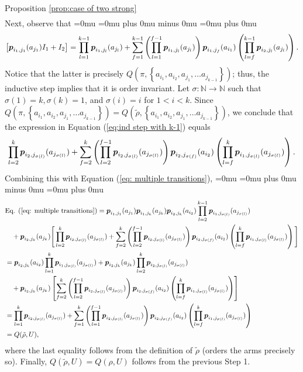 \begin{proofof}{Proposition \ref{prop:case of two strong}}
{\begin{align}
\end{align}}%
Next, observe that
{\thinmuskip=0mu
\medmuskip=0mu plus 0mu minus 0mu
\thickmuskip=0mu plus 0mu
\begin{equation}\label{eq:ind step with k-1}
\left[\boldsymbol{ p }_{{i_1},{j_1}}(a_{j_1})I_1+I_2\right]=\prod_{l=1}^{k-1} \boldsymbol{ p }_{{i_1},{j_l}}(a_{j_l})+\sum_{f=1}^{k-1} \left(\prod_{l=1}^{f-1} \boldsymbol{ p }_{{i_1},{j_l}}(a_{j_l})\right) \boldsymbol{ p }_{{i_1},{j_f}}(a_{i_1}) \left(\prod_{l=f}^{k-1} \boldsymbol{ p }_{{i_2},{j_l}}(a_{j_l})\right).
\end{equation}}%
Notice that the latter is precisely $Q(\pi,\left\{a_{i_1},a_{i_2},a_{j_1},\dots a_{j_{k-1}}\right\})$; thus, the inductive step implies that it is order invariant. Let $\sigma:\mathbb N \rightarrow \mathbb N$ such that $\sigma(1)=k,\sigma(k)=1$, and $\sigma(i)=i$ for $1<i<k$. Since $Q(\pi,\left\{a_{i_1},a_{i_2},a_{j_1},\dots a_{j_{k-1}}\right\})=Q(\tilde \rho,\left\{a_{i_1},a_{i_2},a_{j_1},\dots a_{j_{k-1}}\right\})$, we conclude that the expression in Equation (\ref{eq:ind step with k-1}) equals 
\[
\prod_{l=2}^{k} \boldsymbol{ p }_{{i_2},{j_{\sigma(l)}}}(a_{j_{\sigma(l)}})+\sum_{f=2}^{k} \left(\prod_{l=2}^{f-1} \boldsymbol{ p }_{{i_2},{j_{\sigma(l)}}}(a_{j_{\sigma(l)}})\right) \boldsymbol{ p }_{{i_2},{j_{\sigma(f)}}}(a_{i_2}) \left(\prod_{l=f}^{k} \boldsymbol{ p }_{{i_1},{j_{\sigma(l)}}}(a_{j_{\sigma(l)}})\right).
\]
Combining this with Equation (\ref{eq: multiple transitions}),
{\thinmuskip=0mu
\medmuskip=0mu plus 0mu minus 0mu
\thickmuskip=0mu plus 0mu
\begin{align}
&\textnormal{Eq. }\refeq{eq: multiple transitions}=\bl p_{{i_1},{j_1}}(a_{j_1})\bl p_{{i_1},{j_k}}(a_{j_k})\bl p_{{i_2},{j_k}}(a_{i_2})\prod_{l=2}^{k-1} \bl p_{{i_1},{j_{\sigma(l)}}}(a_{j_{\sigma(l)}})\nonumber\\
&\quad +\bl p_{{i_2},{j_k}}(a_{j_k})\Bigg[
\prod_{l=2}^{k} \bl p_{{i_2},{j_{\sigma(l)}}}(a_{j_{\sigma(l)}})+\sum_{f=2}^{k} \left(\prod_{l=2}^{f-1} \bl p_{{i_2},{j_{\sigma(l)}}}(a_{j_{\sigma(l)}})\right) \bl p_{{i_2},{j_{\sigma(f)}}}(a_{i_2}) \left(\prod_{l=f}^{k} \bl p_{{i_1},{j_{\sigma(l)}}}(a_{j_{\sigma(l)}})\right)
\Bigg]\nonumber\\
&=\bl p_{{i_2},{j_k}}(a_{i_2})\prod_{l=1}^{k} \bl p_{{i_1},{j_{\sigma(l)}}}(a_{j_{\sigma(l)}})+\bl p_{{i_2},{j_k}}(a_{j_k})
\prod_{l=2}^{k} \bl p_{{i_2},{j_{\sigma(l)}}}(a_{j_{\sigma(l)}})\nonumber\\
&\quad +\bl p_{{i_2},{j_k}}(a_{j_k})\left[
\sum_{f=2}^{k} \left(\prod_{l=2}^{f-1} \bl p_{{i_2},{j_{\sigma(l)}}}(a_{j_{\sigma(l)}})\right) \bl p_{{i_2},{j_{\sigma(f)}}}(a_{i_2}) \left(\prod_{l=f}^{k} \bl p_{{i_1},{j_{\sigma(l)}}}(a_{j_{\sigma(l)}})\right)
\right]\nonumber\\
&=\prod_{l=1}^{k} \bl p_{{i_2},{j_{\sigma(l)}}}(a_{j_{\sigma(l)}})+
\sum_{f=1}^{k} \left(\prod_{l=1}^{f-1} \bl p_{{i_2},{j_{\sigma(l)}}}(a_{j_{\sigma(l)}})\right) \bl p_{{i_2},{j_{\sigma(f)}}}(a_{i_2}) \left(\prod_{l=f}^{k} \bl p_{{i_1},{j_{\sigma(l)}}}(a_{j_{\sigma(l)}})\right)\nonumber\\
&=Q(\tilde \rho ,U),
\end{align}}%
where the last equality follows from the definition of $\tilde \rho$ (orders the arms precisely so). Finally, $Q(\tilde \rho, U)=Q(\rho ,U)$ follows from the previous Step 1.

\end{proofof}
